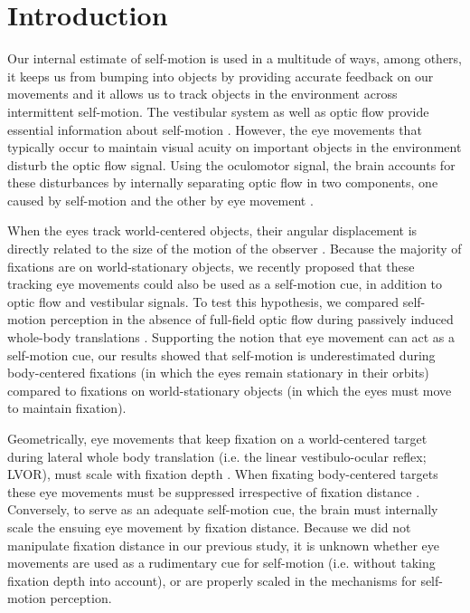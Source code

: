 \section{Introduction}

Our internal estimate of self-motion is used in a multitude of ways, among others, it keeps us from bumping into objects by providing accurate feedback on our movements and it allows us to track objects in the environment across intermittent self-motion. The vestibular system as well as optic flow provide essential information about self-motion \cite{gibson1955, benson1986, harris2000, israel1989, angelaki2005, carriot2013, chen2010}. However, the eye movements that typically occur to maintain visual acuity on important objects in the environment disturb the optic flow signal. Using the oculomotor signal, the brain accounts for these disturbances by internally separating optic flow in two components, one caused by self-motion and the other by eye movement  \cite{warren1988, royden1992, freeman1998, lappe1999}.

When the eyes track world-centered objects, their angular displacement is directly related to the size of the motion of the observer \cite{schwarz1989, paige1998, mchenry2000, medendorp2002}. Because  the majority of fixations are on world-stationary  objects, we recently proposed that these tracking eye movements could also be used as a self-motion cue, in addition to optic flow and vestibular signals. To test this hypothesis, we compared self-motion perception in the absence of full-field optic flow during passively induced whole-body translations \cite{clemens2015a}. Supporting the notion that eye movement can act as a self-motion cue, our results showed that self-motion is underestimated during body-centered fixations (in which the eyes remain stationary in their orbits) compared to fixations on world-stationary objects (in which the eyes must move to maintain fixation).

Geometrically, eye movements that keep fixation on a world-centered target during lateral whole body translation (i.e. the linear vestibulo-ocular reflex; LVOR), must scale with fixation depth \cite{angelaki2004}. When fixating body-centered targets these eye movements must be suppressed irrespective of fixation distance \cite{angelaki2004}. Conversely, to serve as an adequate self-motion cue, the brain must internally scale the ensuing eye movement by fixation distance. Because we did not manipulate fixation distance in our previous study, it is unknown whether eye movements are used as a rudimentary cue for self-motion (i.e. without taking fixation depth into account), or are properly scaled in the mechanisms for self-motion perception.

